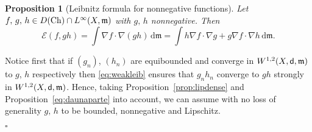\documentclass[reqno,11pt]{article}
\numberwithin{equation}{section}
\newcommand{\C}{\mathbb{C}}
\newcommand{\mm}{{\mbox{\boldmath$m$}}}
\newcommand{\sfd}{{\sf d}}
\renewcommand{\d}{{\mathrm d}}
\newenvironment{proof}{\removelastskip\par\medskip   %
\noindent{\em Proof.}
\rm}{\penalty-20\null\hfill$\square$\par\medbreak}
\newtheorem{proposition}[theorem]{Proposition}
\renewcommand{\C}{{\rm Ch}}
\renewcommand{\mm}{\mathfrak m}
\begin{document}
\begin{proposition}[Leibnitz formula for nonnegative functions]
Let $f,\,g,\,h\in D(\C)\cap L^\infty(X,\mm)$ with $g,\,h$
nonnegative. Then
\begin{equation}
\label{eq:leibniz}
\mathcal E(f,gh)=\int\nabla
f\cdot\nabla(gh)\,\d\mm=\int h\nabla f\cdot\nabla g+g\nabla
f\cdot\nabla h\,\d\mm.
\end{equation}
\end{proposition}
\begin{proof} Notice first that if $(g_n)$, $(h_n)$ are equibounded and converge
in $W^{1,2}(X,\sfd,\mm)$ to $g$, $h$ respectively then
\eqref{eq:weakleib} ensures that $g_nh_n$ converge to $gh$ strongly
in $W^{1,2}(X,\sfd,\mm)$. Hence, taking
Proposition~\ref{prop:lipdense} and Proposition~\ref{eq:daunaparte}
into account, we can assume with no loss of generality $g,\,h$ to be
bounded, nonnegative and Lipschitz.


\end{proof}
\end{document}
